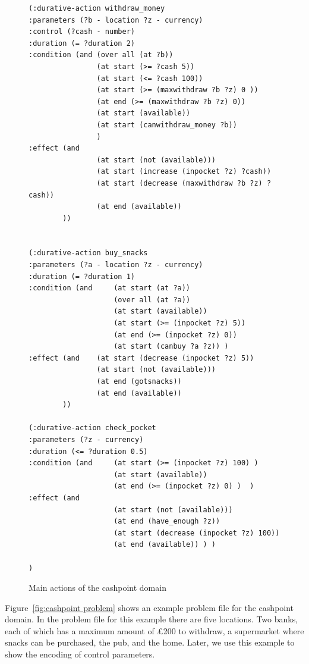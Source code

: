\begin{figure}[thb]
\scriptsize
\begin{verbatim}
(:durative-action withdraw_money
:parameters (?b - location ?z - currency)
:control (?cash - number)
:duration (= ?duration 2)
:condition (and (over all (at ?b)) 
                (at start (>= ?cash 5))
                (at start (<= ?cash 100))
                (at start (>= (maxwithdraw ?b ?z) 0 ))
                (at end (>= (maxwithdraw ?b ?z) 0))
                (at start (available))
                (at start (canwithdraw_money ?b))
				)
:effect (and   	
                (at start (not (available)))
                (at start (increase (inpocket ?z) ?cash))
                (at start (decrease (maxwithdraw ?b ?z) ?cash))
                (at end (available))
        ))

        
(:durative-action buy_snacks
:parameters (?a - location ?z - currency)
:duration (= ?duration 1)
:condition (and     (at start (at ?a))
                    (over all (at ?a))
                    (at start (available))
                    (at start (>= (inpocket ?z) 5))
                    (at end (>= (inpocket ?z) 0))
                    (at start (canbuy ?a ?z)) )
:effect (and    (at start (decrease (inpocket ?z) 5)) 
                (at start (not (available)))
                (at end (gotsnacks))
                (at end (available))
        ))
        
(:durative-action check_pocket
:parameters (?z - currency)
:duration (<= ?duration 0.5)
:condition (and     (at start (>= (inpocket ?z) 100) )
                    (at start (available))
                    (at end (>= (inpocket ?z) 0) )  )
:effect (and        
                    (at start (not (available)))
                    (at end (have_enough ?z)) 
                    (at start (decrease (inpocket ?z) 100))
                    (at end (available)) ) )      

) 
\end{verbatim}
\caption{Main actions of the cashpoint domain}
\label{fig:actions cashpoint domain}
\end{figure}

Figure~\ref{fig:cashpoint problem} shows an example problem file for the cashpoint domain. In the problem file for this example there are five locations. Two banks, each of which has a maximum amount of \pounds200 to withdraw, a supermarket where snacks can be purchased, the pub, and the home. Later, we use this example to show the encoding of control parameters.

